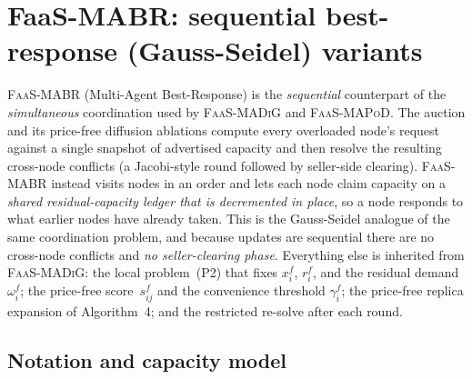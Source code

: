 
\section{FaaS-MABR: sequential best-response (Gauss-Seidel) variants}
\label{sec:mabr}

\textsc{FaaS-MABR} (Multi-Agent Best-Response) is the \emph{sequential}
counterpart of the \emph{simultaneous} coordination used by \textsc{FaaS-MADiG}
and \textsc{FaaS-MAPoD}. The auction and its price-free diffusion ablations
compute every overloaded node's request against a single snapshot of advertised
capacity and then resolve the resulting cross-node conflicts (a Jacobi-style
round followed by seller-side clearing). \textsc{FaaS-MABR} instead visits nodes
in an order and lets each node claim capacity on a \emph{shared residual-capacity
ledger that is decremented in place}, so a node responds to what earlier nodes
have already taken. This is the Gauss-Seidel analogue of the same coordination
problem, and because updates are sequential there are no cross-node conflicts and
\emph{no seller-clearing phase}. Everything else is inherited from
\textsc{FaaS-MADiG}: the local problem~(P2) that fixes $x_i^f$, $r_i^f$, and the
residual demand $\omega_i^f$; the price-free score~$s_{ij}^f$ and the convenience
threshold $\gamma_i^f$; the price-free replica expansion of Algorithm~4; and the
restricted re-solve after each round.

\subsection{Notation and capacity model}
\label{sec:mabr-notation}

